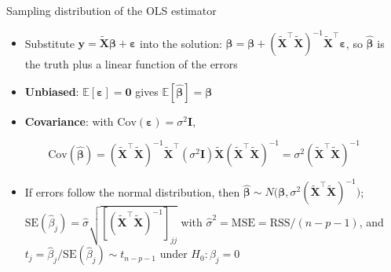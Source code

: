 \begin{frame}{Sampling distribution of the OLS estimator}
    \begin{itemize}
        \item Substitute $\mathbf{y} = \tilde{\mathbf{X}} \symbf{\beta} + \symbf{\varepsilon}$ into the solution: $\hat{\symbf{\beta}} = \symbf{\beta} + (\tilde{\mathbf{X}}^\top \tilde{\mathbf{X}})^{-1} \tilde{\mathbf{X}}^\top \symbf{\varepsilon}$, so $\hat{\symbf{\beta}}$ is the truth plus a linear function of the errors
        \item \textbf{Unbiased}: $\mathbb{E}[\symbf{\varepsilon}] = \mathbf{0}$ gives $\mathbb{E}[\hat{\symbf{\beta}}] = \symbf{\beta}$
        \item \textbf{Covariance}: with $\mathrm{Cov}(\symbf{\varepsilon}) = \sigma^2 \mathbf{I}$,
    \end{itemize}
    \[
        \mathrm{Cov}(\hat{\symbf{\beta}}) = (\tilde{\mathbf{X}}^\top \tilde{\mathbf{X}})^{-1} \tilde{\mathbf{X}}^\top (\sigma^2 \mathbf{I}) \tilde{\mathbf{X}} (\tilde{\mathbf{X}}^\top \tilde{\mathbf{X}})^{-1} = \sigma^2 (\tilde{\mathbf{X}}^\top \tilde{\mathbf{X}})^{-1}
    \]
    \begin{itemize}
        \item If errors follow the normal distribution, then $\hat{\symbf{\beta}} \sim N\big(\symbf{\beta}, \sigma^2 (\tilde{\mathbf{X}}^\top \tilde{\mathbf{X}})^{-1}\big)$; $\mathrm{SE}(\hat\beta_j) = \hat\sigma \sqrt{[(\tilde{\mathbf{X}}^\top \tilde{\mathbf{X}})^{-1}]_{jj}}$ with $\hat\sigma^2 = \mathrm{MSE} = \mathrm{RSS}/(n-p-1)$, and $t_j = \hat\beta_j / \mathrm{SE}(\hat\beta_j) \sim t_{n-p-1}$ under $H_0\colon \beta_j = 0$
    \end{itemize}
\end{frame}




